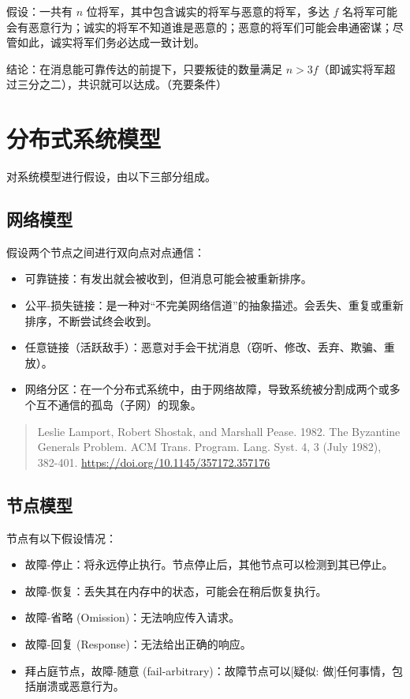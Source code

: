假设：一共有 $n$ 位将军，其中包含诚实的将军与恶意的将军，多达 $f$ 名将军可能会有恶意行为；诚实的将军不知道谁是恶意的；恶意的将军们可能会串通密谋；尽管如此，诚实将军们务必达成一致计划。

结论：在消息能可靠传达的前提下，只要叛徒的数量满足 $n > 3f$（即诚实将军超过三分之二），共识就可以达成。（充要条件）

\section{分布式系统模型}

对系统模型进行假设，由以下三部分组成。

\subsection{网络模型}

假设两个节点之间进行双向点对点通信：
\begin{itemize}
\item 可靠链接：有发出就会被收到，但消息可能会被重新排序。
\item 公平-损失链接：是一种对“不完美网络信道”的抽象描述。会丢失、重复或重新排序，不断尝试终会收到。
\item 任意链接（活跃敌手）：恶意对手会干扰消息（窃听、修改、丢弃、欺骗、重放）。
\item 网络分区：在一个分布式系统中，由于网络故障，导致系统被分割成两个或多个互不通信的孤岛（子网）的现象。
\end{itemize}

\begin{quote}
Leslie Lamport, Robert Shostak, and Marshall Pease. 1982. The Byzantine Generals Problem. ACM Trans. Program. Lang. Syst. 4, 3 (July 1982), 382-401. \url{https://doi.org/10.1145/357172.357176}
\end{quote}

\subsection{节点模型}

节点有以下假设情况：
\begin{itemize}
\item 故障-停止：将永远停止执行。节点停止后，其他节点可以检测到其已停止。
\item 故障-恢复：丢失其在内存中的状态，可能会在稍后恢复执行。
\item 故障-省略 (Omission)：无法响应传入请求。
\item 故障-回复 (Response)：无法给出正确的响应。
\item 拜占庭节点，故障-随意 (fail-arbitrary)：故障节点可以[疑似: 做]任何事情，包括崩溃或恶意行为。
\end{itemize}

